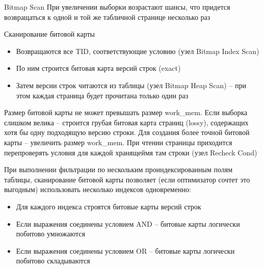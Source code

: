 \documentclass[12pt]{article}
\begin{document}
\begin{defin}{Bitmap Scan}
    При увеличении выборки возрастают шансы, что придется возвращаться к одной и той же табличной странице несколько раз 

    Сканирование битовой карты 

    \begin{itemize}
        \item Возвращаются все TID, соответствующие условию (узел Bitmap Index Scan)
        \item По ним строится битовая карта версий строк (exact)
        \item Затем версии строк читаются из таблицы (узел Bitmap Heap Scan) -- при этом каждая страница будет прочитана только один раз 
    \end{itemize}

    Размер битовой карты не может превышать размер work\_mem. Если выборка слишком велика -- строится грубая битовая карта страниц (lossy), содержащих хотя бы одну подходящую версию строки. Для создания более точной битовой карты -- увеличить размер work\_mem. При чтении страницы приходится перепроверять условия для каждой хранящеймя там строки (узел Recheck Cond)

    При выполнении фильтрации по нескольким проиндексированным полям таблицы, сканирование битовой карты позволяет (если оптимизатор сочтет это выгодным) использовать несколько индексов одновременно:

    \begin{itemize}
        \item Для каждого индекса строятся битовые карты версий строк 
        \item Если выражения соединены условием AND -- битовые карты логически побитово умножаются 
        \item Если выражения соединены условием OR -- битовые карты логически побитово складываются
    \end{itemize}
\end{defin}
\end{document}
